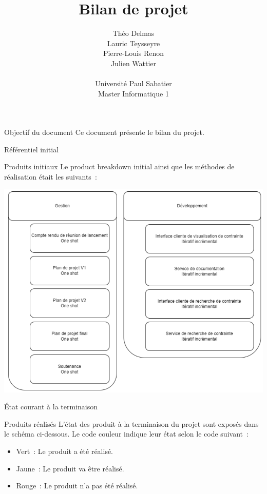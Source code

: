 \documentclass[]{article}
\title{Bilan de projet}
\author{
    Théo Delmas\\
    Lauric Teysseyre\\
    Pierre-Louis Renon\\
    Julien Wattier\\
    \\
    Université Paul Sabatier\\
    Master Informatique 1\\
   }
\begin{document}
\maketitle
\newpage
\tableofcontents
\newpage

\begin{section}{Objectif du document}
 Ce document présente le bilan du projet.
\end{section}

{
\setlength{\parindent}{0pt} %
\begin{section}{Référentiel initial}
 \begin{subsection}{Produits initiaux}
     Le product breakdown initial ainsi que les méthodes de réalisation était les suivants :

     \includegraphics[scale=0.6]{IMG/PBS_initial}
 \end{subsection}
\end{section}

\begin{section}{État courant à la terminaison}
 \begin{subsection}{Produits réalisés}
     L’état des produit à la terminaison du projet sont exposés dans le schéma ci-dessous. Le code couleur indique leur état selon le code suivant :

     \begin{itemize}
         \item Vert : Le produit a été réalisé.
         \item Jaune : Le produit va être réalisé.
         \item Rouge : Le produit n’a pas été réalisé.
     \end{itemize}


\end{subsection}
\end{section}}
\end{document}
